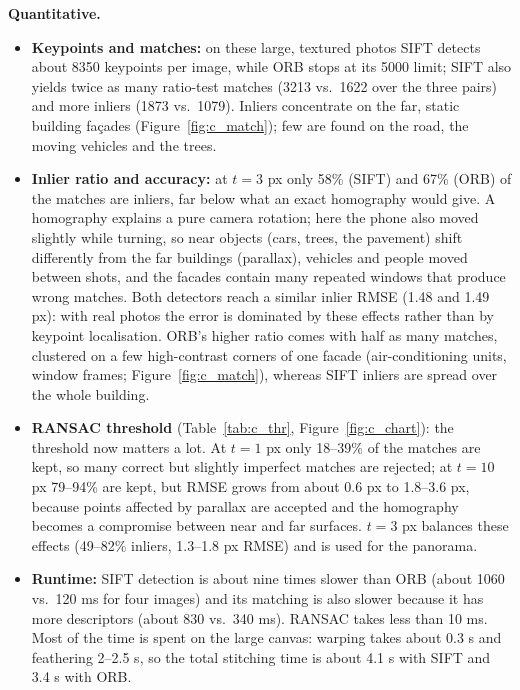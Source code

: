 \documentclass[a4paper,12pt]{article}
\begin{document}
\textbf{Quantitative.}
\begin{itemize}
    \item \textbf{Keypoints and matches:} on these large, textured photos SIFT detects about 8350 keypoints per image, while ORB stops at its 5000 limit; SIFT also yields twice as many ratio-test matches (3213 vs.\ 1622 over the three pairs) and more inliers (1873 vs.\ 1079). Inliers concentrate on the far, static building fa\c{c}ades (Figure~\ref{fig:c_match}); few are found on the road, the moving vehicles and the trees.
    \item \textbf{Inlier ratio and accuracy:} at $t=3$ px only 58\% (SIFT) and 67\% (ORB) of the matches are inliers, far below what an exact homography would give. A homography explains a pure camera rotation; here the phone also moved slightly while turning, so near objects (cars, trees, the pavement) shift differently from the far buildings (parallax), vehicles and people moved between shots, and the facades contain many repeated windows that produce wrong matches. Both detectors reach a similar inlier RMSE (1.48 and 1.49 px): with real photos the error is dominated by these effects rather than by keypoint localisation. ORB's higher ratio comes with half as many matches, clustered on a few high-contrast corners of one facade (air-conditioning units, window frames; Figure~\ref{fig:c_match}), whereas SIFT inliers are spread over the whole building.
    \item \textbf{RANSAC threshold} (Table~\ref{tab:c_thr}, Figure~\ref{fig:c_chart}): the threshold now matters a lot. At $t=1$ px only 18--39\% of the matches are kept, so many correct but slightly imperfect matches are rejected; at $t=10$ px 79--94\% are kept, but RMSE grows from about 0.6 px to 1.8--3.6 px, because points affected by parallax are accepted and the homography becomes a compromise between near and far surfaces. $t=3$ px balances these effects (49--82\% inliers, 1.3--1.8 px RMSE) and is used for the panorama.
    \item \textbf{Runtime:} SIFT detection is about nine times slower than ORB (about 1060 vs.\ 120 ms for four images) and its matching is also slower because it has more descriptors (about 830 vs.\ 340 ms). RANSAC takes less than 10 ms. Most of the time is spent on the large canvas: warping takes about 0.3 s and feathering 2--2.5 s, so the total stitching time is about 4.1 s with SIFT and 3.4 s with ORB.
\end{itemize}
\end{document}
